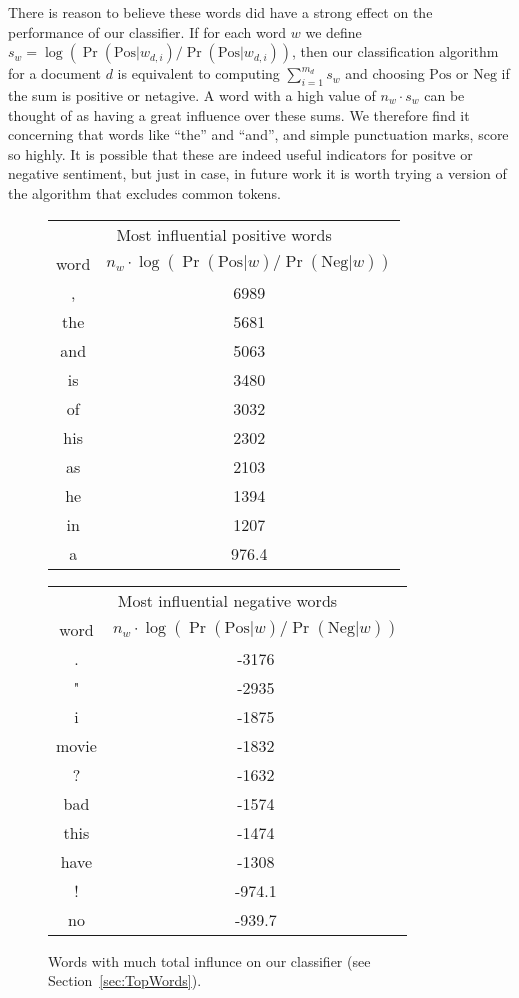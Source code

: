 \documentclass{article}
\newcommand{\PosC}{\mathrm{Pos}}
\newcommand{\NegC}{\mathrm{Neg}}
\begin{document}
There is reason to believe these words did have a strong effect on the performance of our classifier.
If for each word \(w\) we define \(s_w = \log(\Pr(\PosC|w_{d,i}) / \Pr(\PosC|w_{d,i}))\), then
our classification algorithm for a document \(d\) is equivalent to computing \(\sum_{i=1}^{m_d} s_w\) and choosing \(\PosC\) or \(\NegC\) if the sum is positive or netagive.
A word with a high value of \(n_w \cdot s_w\) can be thought of as having a great influence over these sums.
We therefore find it concerning that words like ``the'' and ``and'', and simple punctuation marks, score so highly.
It is possible that these are indeed useful indicators for positve or negative sentiment, but just in case, in future work it is worth trying a version of the algorithm that excludes common tokens.

\begin{figure}
\begin{tabular}{c|c}
    \multicolumn{2}{c}{Most influential positive words} \\
    word & \(n_w \cdot \log(\Pr(\PosC|w) / \Pr(\NegC|w))\) \\
    \hline
     , & 6989 \\
    the & 5681 \\
    and & 5063 \\
    is & 3480 \\
    of & 3032 \\
    his & 2302 \\
    as & 2103 \\
    he & 1394 \\
    in & 1207 \\
    a & 976.4
\end{tabular}
\begin{tabular}{c|c}
    \multicolumn{2}{c}{Most influential negative words} \\
    word & \(n_w \cdot \log(\Pr(\PosC|w) / \Pr(\NegC|w))\) \\
    \hline
    . & -3176 \\
    " & -2935 \\
    i & -1875 \\
    movie & -1832 \\
    ? & -1632 \\
    bad & -1574 \\
    this & -1474 \\
    have & -1308 \\
    ! & -974.1 \\
    no & -939.7
\end{tabular}
\caption{\label{fig:MostInfluentialWords} Words with much total influnce on our classifier (see Section~\ref{sec:TopWords}).}
\end{figure}

{}

\end{document}
